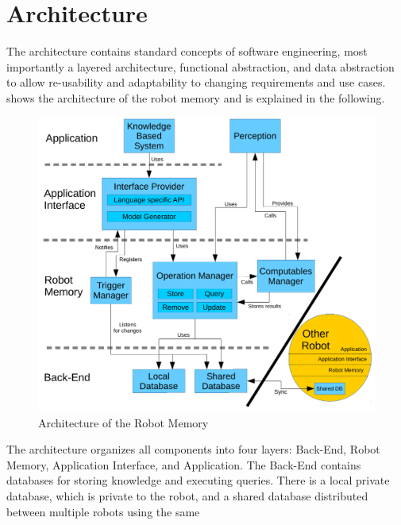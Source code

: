 \section{Architecture}
\label{sec:architecture}
The architecture contains
standard concepts of software engineering, most importantly a layered
architecture, functional abstraction, and data
abstraction~\cite{software-architecture} to allow
re-usability and adaptability to changing requirements and use cases.
 shows the architecture of the robot
memory and is explained in the following.
\begin{figure}[ht!]
  \centering
  \includegraphics[width=1.0\textwidth]{architecture.pdf}
  \vspace{-5mm}
  \caption[Architecture of the Robot Memory]{Architecture of the Robot Memory}
  \label{fig:arch}
  \vspace{-0mm}
\end{figure}
The architecture organizes all components into four layers: Back-End,
Robot Memory, Application Interface, and Application. The Back-End
contains databases for storing knowledge and executing queries. There
is a local private database, which is private to the robot, and a
shared database distributed between multiple robots using the same
